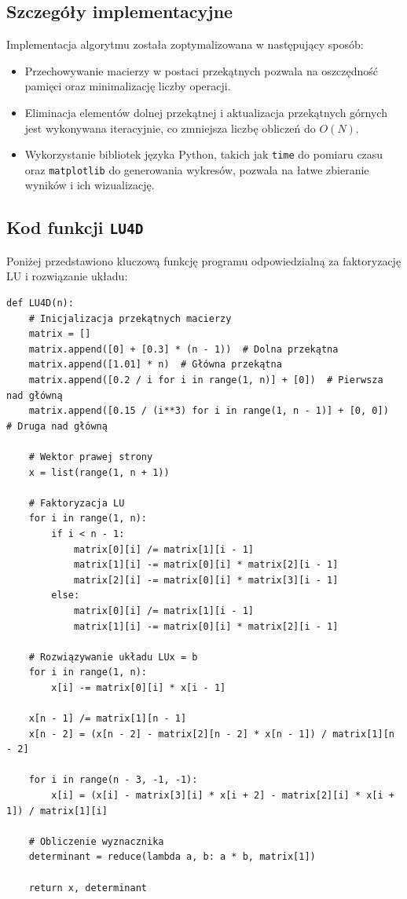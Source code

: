 \documentclass[a4paper,12pt]{article}
\begin{document}
\subsection{Szczegóły implementacyjne}

Implementacja algorytmu została zoptymalizowana w następujący sposób:
\begin{itemize}
    \item Przechowywanie macierzy w postaci przekątnych pozwala na oszczędność pamięci oraz minimalizację liczby operacji.
    \item Eliminacja elementów dolnej przekątnej i aktualizacja przekątnych górnych jest wykonywana iteracyjnie, co zmniejsza liczbę obliczeń do $O(N)$.
    \item Wykorzystanie bibliotek języka Python, takich jak \texttt{time} do pomiaru czasu oraz \texttt{matplotlib} do generowania wykresów, pozwala na łatwe zbieranie wyników i ich wizualizację.
\end{itemize}

\subsection{Kod funkcji \texttt{LU4D}}

Poniżej przedstawiono kluczową funkcję programu odpowiedzialną za faktoryzację LU i rozwiązanie układu:
\begin{verbatim}
def LU4D(n):
    # Inicjalizacja przekątnych macierzy
    matrix = []
    matrix.append([0] + [0.3] * (n - 1))  # Dolna przekątna
    matrix.append([1.01] * n)  # Główna przekątna
    matrix.append([0.2 / i for i in range(1, n)] + [0])  # Pierwsza nad główną
    matrix.append([0.15 / (i**3) for i in range(1, n - 1)] + [0, 0])  # Druga nad główną

    # Wektor prawej strony
    x = list(range(1, n + 1))

    # Faktoryzacja LU
    for i in range(1, n):
        if i < n - 1:
            matrix[0][i] /= matrix[1][i - 1]
            matrix[1][i] -= matrix[0][i] * matrix[2][i - 1]
            matrix[2][i] -= matrix[0][i] * matrix[3][i - 1]
        else:
            matrix[0][i] /= matrix[1][i - 1]
            matrix[1][i] -= matrix[0][i] * matrix[2][i - 1]

    # Rozwiązywanie układu LUx = b
    for i in range(1, n):
        x[i] -= matrix[0][i] * x[i - 1]

    x[n - 1] /= matrix[1][n - 1]
    x[n - 2] = (x[n - 2] - matrix[2][n - 2] * x[n - 1]) / matrix[1][n - 2]

    for i in range(n - 3, -1, -1):
        x[i] = (x[i] - matrix[3][i] * x[i + 2] - matrix[2][i] * x[i + 1]) / matrix[1][i]

    # Obliczenie wyznacznika
    determinant = reduce(lambda a, b: a * b, matrix[1])

    return x, determinant
\end{verbatim}
\end{document}
